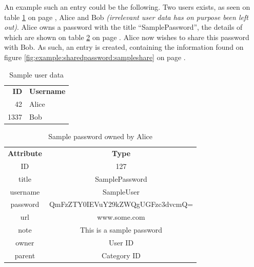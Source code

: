 			An example such an entry could be the following. Two users exists, as seen on table \ref{fig:example:sharedpassword:users} on page \pageref{fig:example:sharedpassword:users}, Alice and Bob \emph{(irrelevant user data has on purpose been left out)}. Alice owns a password with the title ``SamplePassword'', the details of which are shown on table \ref{fig:example:sharedpassword:samplepassword} on page \pageref{fig:example:sharedpassword:samplepassword}. Alice now wishes to share this password with Bob. As such, an entry is created, containing the information found on figure \ref{fig:example:sharedpassword:sampleshare} on page \pageref{fig:example:sharedpassword:sampleshare}.
			\begin{table}[p]
				\centering
				\begin{tabular}{r|l}
					\textbf{ID} 		& \textbf{Username} \\
					42 					& Alice 			\\
					1337  				& Bob 				\\
				\end{tabular}
				\caption{Sample user data}
				\label{fig:example:sharedpassword:users}
			\end{table}

			\begin{table}[p]
				\centering
				\begin{tabular}{c|c}
					\textbf{Attribute} 		& \textbf{Type} 											\\
					ID 						& 127 														\\
					title 					& SamplePassword 											\\
					username 				& SampleUser 												\\
					password 				& QmFzZTY0IEVuY29kZWQgUGFzc3dvcmQ= 							\\
					url						& www.some.com 												\\
					note  					& This is a sample password 								\\
					owner 					& User ID 													\\
					parent 					& Category ID 												\\
				\end{tabular}
				\caption{Sample password owned by Alice}
				\label{fig:example:sharedpassword:samplepassword}
			\end{table}


